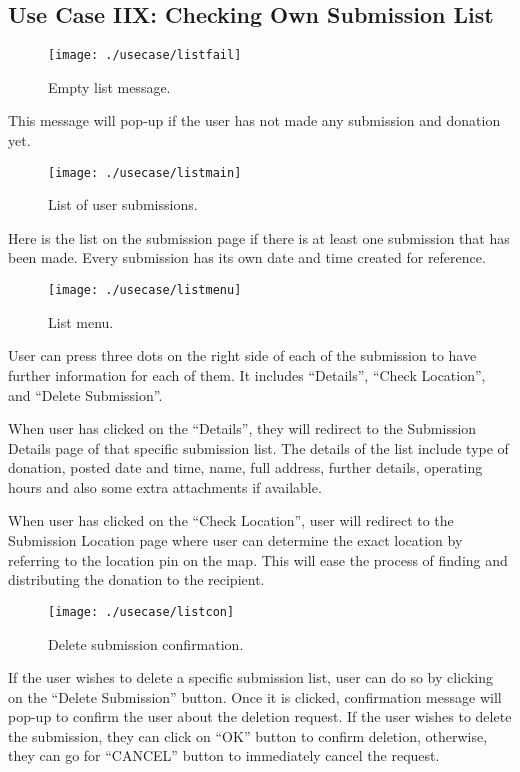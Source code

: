 \documentclass[conference]{IEEEtran}
\begin{document}
\subsection{Use Case IIX: Checking Own Submission List}

\begin{figure}[h!]
\texttt{[image: ./usecase/listfail]}
\centering
\caption{Empty list message.}
\end{figure}

This message will pop-up if the user has not made any submission and donation yet.

\begin{figure}[h!]
\texttt{[image: ./usecase/listmain]}
\centering
\caption{List of user submissions.}
\end{figure}

Here is the list on the submission page if there is at least one submission that has been made. Every submission has its own date and time created for reference.

\begin{figure}[h!]
\texttt{[image: ./usecase/listmenu]}
\centering
\caption{List menu.}
\end{figure}

User can press three dots on the right side of each of the submission to have further information for each of them. It includes “Details”, “Check Location”, and “Delete Submission”. 

When user has clicked on the “Details”, they will redirect to the Submission Details page of that specific submission list. The details of the list include type of donation, posted date and time, name, full address, further details, operating hours and also some extra attachments if available.

When user has clicked on the “Check Location”, user will redirect to the Submission Location page where user can determine the exact location by referring to the location pin on the map. This will ease the process of finding and distributing the donation to the recipient.

\begin{figure}[h!]
\texttt{[image: ./usecase/listcon]}
\centering
\caption{Delete submission confirmation.}
\end{figure}

If the user wishes to delete a specific submission list, user can do so by clicking on the “Delete Submission” button. Once it is clicked, confirmation message will pop-up to confirm the user about the deletion request. If the user wishes to delete the submission, they can click on “OK” button to confirm deletion, otherwise, they can go for “CANCEL” button to immediately cancel the request.
\end{document}
